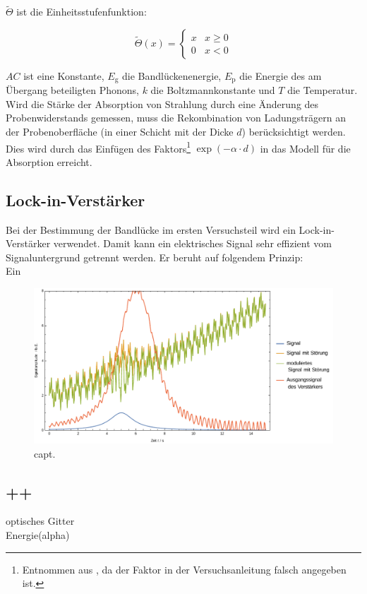 $\tilde{\Theta}$ ist die Einheitsstufenfunktion:

\begin{equation}
\label{}
\tilde{\Theta}(x)=
\begin{cases}
x & x \geq 0 \\
0 & x < 0
\end{cases}
\end{equation}

$AC$ ist eine Konstante,
$E_{\text{g}}$ die Bandlückenenergie, $E_{\text{p}}$ die Energie des am Übergang beteiligten Phonons,
$k$ die Boltzmannkonstante und $T$ die Temperatur.\\
Wird die Stärke der Absorption von Strahlung durch eine Änderung des Probenwiderstands gemessen,
muss die Rekombination von Ladungsträgern an der Probenoberfläche
(in einer Schicht mit der Dicke $d$) berücksichtigt werden.
Dies wird durch das Einfügen des
Faktors\footnote{Entnommen aus \cite{staatsex}, da der Faktor in der Versuchsanleitung falsch angegeben ist.}
$\exp(-\alpha \cdot d)$ in das Modell für die Absorption erreicht.

\subsection{Lock-in-Verstärker}
Bei der Bestimmung der Bandlücke im ersten Versuchsteil wird ein Lock-in-Verstärker verwendet.
Damit kann ein elektrisches Signal sehr effizient vom Signaluntergrund getrennt werden.
Er beruht auf folgendem Prinzip:\\
Ein

\begin{figure}[H]
\begin{center}
  \includegraphics[width=\textwidth]{../img/lockin.pdf}
  \caption{capt.}
  \label{img:lab}
\end{center}
\end{figure}

\subsection{++}
optisches Gitter\\
Energie(alpha)\\

